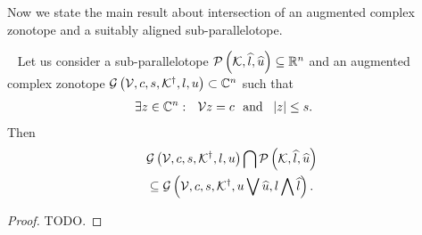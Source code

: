 %
Now we state the main result about intersection of an augmented
complex zonotope and a suitably aligned sub-parallelotope.
%
\begin{theorem}~\label{thm:acz-ptope-intersection}
Let us consider a sub-parallelotope $\mathcal{P}\left(\mathcal{K},\widehat{l},\widehat{u}\right)\subseteq\mathbb{R}^n$ and an
augmented complex zonotope
$\mathcal{G}\left(\mathcal{V},c,s,{\mathcal{K}}^\dagger,l,u\right)\subset\mathbb{C}^n$
such that 
%
\begin{align}
& \exists z\in\mathbb{C}^n:~~\mathcal{V} z=c~~\text{and}~~\left|z\right|\leq s.~\label{eqn:contain-origin}
\end{align}
%
Then
%
\begin{align}
&
\mathcal{G}\left(\mathcal{V},c,s,{\mathcal{K}}^\dagger,l,u\right)\bigcap \mathcal{P}\left(\mathcal{K},\widehat{l},\widehat{u}\right)\nonumber\\
& \subseteq\mathcal{G}\left(\mathcal{V},c,s,{\mathcal{K}}^\dagger,u\bigvee \widehat{u},l\bigwedge \widehat{l}\right).~\label{eqn:thm:acz-ptope-intersection}
\end{align}
%
\end{theorem}
%
\begin{proof}
{\color{red} TODO}.
\end{proof}
%
